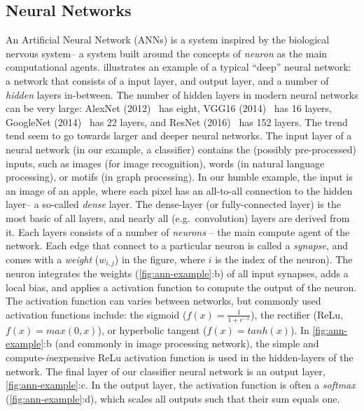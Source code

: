 \documentclass[techrep,english]{ipsj} %
\begin{document}
\subsection{Neural Networks}
An Artificial Neural Network (ANNs) is a system inspired by the biological nervous system-- a system built around the concepts of \textit{neuron} as the main computational agents.
 illustrates an example of a typical “deep” neural network: a network that consists of a input layer, and output layer, and a number of \textit{hidden} layers in-between.
The number of hidden layers in modern neural networks can be very large: AlexNet (2012)~\cite{krizhevsky2012imagenet} has eight, VGG16 (2014)~\cite{simonyan2014very} has 16 layers, GoogleNet (2014)~\cite{szegedy2015going} has 22 layers, and ResNet (2016)~\cite{he2016deep} has 152 layers.
The trend tend seem to go towards larger and deeper neural networks.
The input layer of a neural network (in our example, a classifier) contains the (possibly pre-processed) inputs, such as images (for image recognition), words (in natural language processing), or motifs (in graph processing).
In our humble example, the input is an image of an apple, where each pixel has an all-to-all connection to the hidden layer-- a so-called \textit{dense} layer. The dense-layer (or fully-connected layer) is the most basic of all layers, and nearly all (e.g.\ convolution) layers are derived from it.
Each layers consists of a number of \textit{neurons} – the main compute agent of the network.
Each edge that connect to a particular neuron is called a \textit{synapse}, and comes with a \textit{weight} (\(w_{i,j}\)) in the figure, where \(i\) is the index of the neuron).
The neuron integrates the weights (\cref{fig:ann-example}:b) of all input synapses, adds a local bias, and applies a activation function to compute the output of the neuron. The activation function can varies between networks, but commonly used activation functions include: the sigmoid (\(f(x) = \frac{1}{1+e^{-x}}\)), the rectifier (ReLu, \(f(x) = max(0,x)\)), or hyperbolic tangent (\(f(x) = tanh(x)\)).
In \cref{fig:ann-example}:b (and commonly in image processing network), the simple and compute-\textit{in}expensive ReLu activation function is used in the hidden-layers of the network. The final layer of our classifier neural network is an output layer, \cref{fig:ann-example}:c. In the output layer, the activation function is often a \textit{softmax} (\cref{fig:ann-example}:d), which scales all outputs such that their sum equals one.
\end{document}
